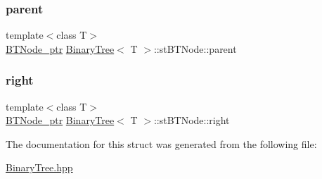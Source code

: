 \subsubsection{\texorpdfstring{parent}{parent}}
{\footnotesize\ttfamily template$<$class T$>$ \\
\hyperlink{struct_binary_tree_1_1st_b_t_node_a33f8df7b779a039664f5b5abc92c134f}{B\+T\+Node\+\_\+ptr} \hyperlink{class_binary_tree}{Binary\+Tree}$<$ T $>$\+::st\+B\+T\+Node\+::parent}

\mbox{\label{struct_binary_tree_1_1st_b_t_node_afda002d3e6698e446a536f9224165c25}} 
\subsubsection{\texorpdfstring{right}{right}}
{\footnotesize\ttfamily template$<$class T$>$ \\
\hyperlink{struct_binary_tree_1_1st_b_t_node_a33f8df7b779a039664f5b5abc92c134f}{B\+T\+Node\+\_\+ptr} \hyperlink{class_binary_tree}{Binary\+Tree}$<$ T $>$\+::st\+B\+T\+Node\+::right}



The documentation for this struct was generated from the following file\+:\begin{DoxyCompactItemize}
\item 
\hyperlink{_binary_tree_8hpp}{Binary\+Tree.\+hpp}\end{DoxyCompactItemize}

